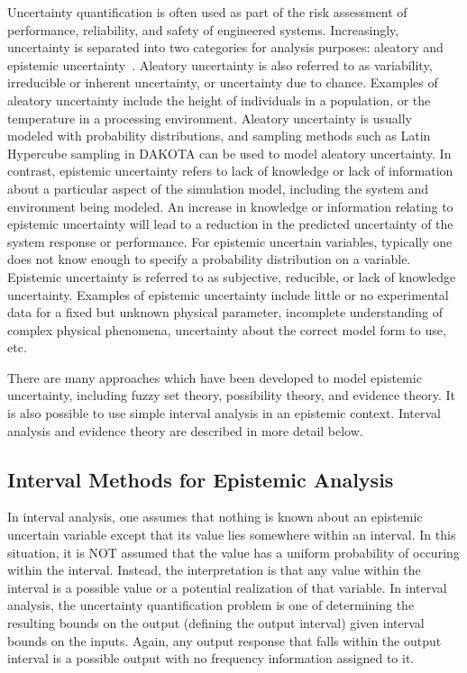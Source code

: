 Uncertainty quantification is often used as part of the risk
assessment of performance, reliability, and safety of engineered
systems.  Increasingly, uncertainty is separated into two categories
for analysis purposes: aleatory and epistemic
uncertainty~\cite{Obe03,Hel07}. Aleatory uncertainty is also referred to as
variability, irreducible or inherent uncertainty, or uncertainty due
to chance. Examples of aleatory uncertainty include the height of
individuals in a population, or the temperature in a processing
environment.  Aleatory uncertainty is usually modeled with probability
distributions, and sampling methods such as Latin Hypercube sampling
in DAKOTA can be used to model aleatory uncertainty. In contrast,
epistemic uncertainty refers to lack of knowledge or lack of
information about a particular aspect of the simulation model,
including the system and environment being modeled. An increase in
knowledge or information relating to epistemic uncertainty will lead
to a reduction in the predicted uncertainty of the system response or
performance. For epistemic uncertain variables, typically one does not
know enough to specify a probability distribution on a variable.
Epistemic uncertainty is referred to as subjective, reducible, or lack
of knowledge uncertainty. Examples of epistemic uncertainty include
little or no experimental data for a fixed but unknown physical
parameter, incomplete understanding of complex physical phenomena,
uncertainty about the correct model form to use, etc.

There are many approaches which have been developed to model epistemic
uncertainty, including fuzzy set theory, possibility theory, and
evidence theory. It is also possible to use simple interval analysis in 
an epistemic context.  Interval analysis and evidence theory are 
described in more detail below.

\subsection{Interval Methods for Epistemic Analysis}\label{uq:interval}
In interval analysis, one assumes that nothing is known about 
an epistemic uncertain variable except that its value lies 
somewhere within an interval.  In this situation, it is NOT 
assumed that the value has a uniform probability of occuring 
within the interval.  Instead, the interpretation is that 
any value within the interval is a possible value or a potential 
realization of that variable.  In interval analysis, the 
uncertainty quantification problem is one of determining the 
resulting bounds on the output (defining the output interval) 
given interval bounds on the inputs. Again, any output response 
that falls within the output interval is a possible output 
with no frequency information assigned to it.

